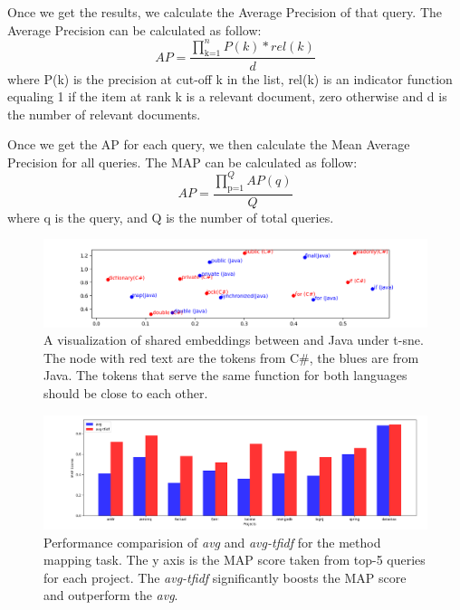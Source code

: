 Once we get the results, we calculate the Average Precision of that query. 
The Average Precision can be calculated as follow:
\begin{displaymath}
AP = \frac{\prod_\text{k=1}^n P(k)*rel(k)}{d}
\end{displaymath}
where P(k) is the precision at cut-off k in the list, rel(k) is an indicator function equaling 1 if the item at rank k is a relevant document, zero otherwise and d is the number of relevant documents.

Once we get the AP for each query, we then calculate the Mean Average Precision for all queries. The MAP can be calculated as follow:
\begin{displaymath}
AP = \frac{\prod_\text{p=1}^Q AP(q)}{Q}
\end{displaymath}
where q is the query, and Q is the number of total queries.
\begin{figure}[t!]
	\centering
	\includegraphics[width=1\textwidth]{example_bi2vec_tsne}
	\caption{A visualization of shared embeddings between  and Java under t-sne. The node with red text are the tokens from C\#, the blues are from Java. The tokens that serve the same function for both languages should be close to each other.}
	\label{fig:tsne}
\end{figure}

\begin{figure}[t!]
	\centering
	
	\includegraphics[width=1.05\textwidth]{avg_vs_tfidf}
	\caption{Performance comparision of \textit{avg} and \textit{avg-tfidf} for the method mapping task. The y axis is the MAP score taken from top-5 queries for each project. The \textit{avg-tfidf} significantly boosts the MAP score and outperform the \textit{avg}.}
	\label{fig:avg_vs_tfidf}
\end{figure}



